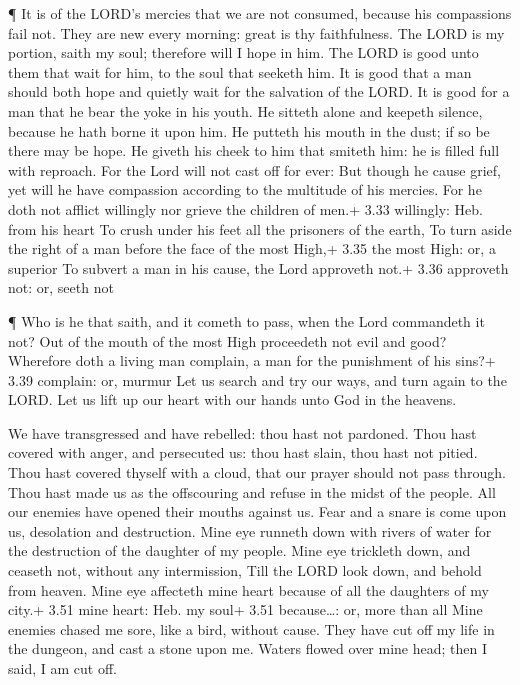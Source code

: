  ¶ It is of the LORD's mercies that we are not consumed,
because his compassions fail not.  They are new every
morning: great is thy faithfulness.  The LORD is my
portion, saith my soul; therefore will I hope in him.  The
LORD is good unto them that wait for him, to the soul that seeketh him.
 It is good that a man should both hope and quietly wait
for the salvation of the LORD.  It is good for a man that
he bear the yoke in his youth.  He sitteth alone and
keepeth silence, because he hath borne it upon him.  He
putteth his mouth in the dust; if so be there may be hope. 
He giveth his cheek to him that smiteth him: he is filled full with
reproach.  For the Lord will not cast off for ever:
 But though he cause grief, yet will he have compassion
according to the multitude of his mercies.  For he doth not
afflict willingly nor grieve the children of men.+ 3.33 willingly: Heb.
from his heart  To crush under his feet all the prisoners
of the earth,  To turn aside the right of a man before the
face of the most High,+ 3.35 the most High: or, a superior 
To subvert a man in his cause, the Lord approveth not.+ 3.36 approveth
not: or, seeth not

 ¶ Who is he that saith, and it cometh to pass, when the
Lord commandeth it not?  Out of the mouth of the most High
proceedeth not evil and good?  Wherefore doth a living man
complain, a man for the punishment of his sins?+ 3.39 complain: or,
murmur  Let us search and try our ways, and turn again to
the LORD.  Let us lift up our heart with our hands unto God
in the heavens.

 We have transgressed and have rebelled: thou hast not
pardoned.  Thou hast covered with anger, and persecuted us:
thou hast slain, thou hast not pitied.  Thou hast covered
thyself with a cloud, that our prayer should not pass through.
 Thou hast made us as the offscouring and refuse in the
midst of the people.  All our enemies have opened their
mouths against us.  Fear and a snare is come upon us,
desolation and destruction.  Mine eye runneth down with
rivers of water for the destruction of the daughter of my people.
 Mine eye trickleth down, and ceaseth not, without any
intermission,  Till the LORD look down, and behold from
heaven.  Mine eye affecteth mine heart because of all the
daughters of my city.+ 3.51 mine heart: Heb. my soul+ 3.51
because\ldots: or, more than all  Mine enemies chased me
sore, like a bird, without cause.  They have cut off my
life in the dungeon, and cast a stone upon me.  Waters
flowed over mine head; then I said, I am cut off.

